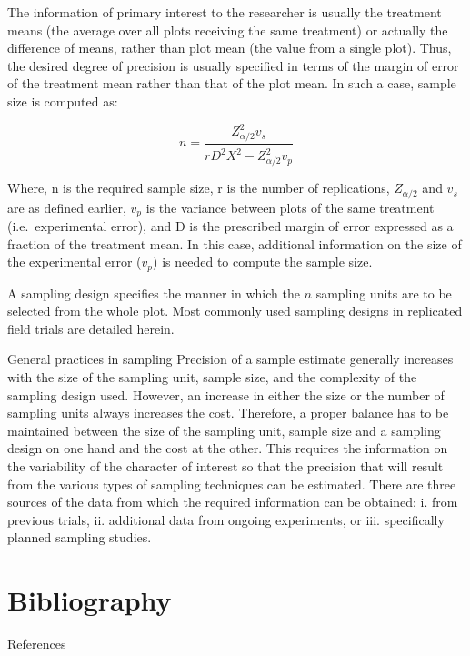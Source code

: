 \documentclass[
  ignorenonframetext,
  aspectratio=169]{beamer}
\begin{document}
\begin{frame}{}
\protect\hypertarget{section-12}{}
\footnotesize

The information of primary interest to the researcher is usually the
treatment means (the average over all plots receiving the same
treatment) or actually the difference of means, rather than plot mean
(the value from a single plot). Thus, the desired degree of precision is
usually specified in terms of the margin of error of the treatment mean
rather than that of the plot mean. In such a case, sample size is
computed as:

\[
n = \frac{Z_{\alpha/2}^2 v_s}{r D^2 \bar{X^2} - Z_{\alpha/2}^2 v_p}
\]

Where, n is the required sample size, r is the number of replications,
\(Z_{\alpha/2}\) and \(v_s\) are as defined earlier, \(v_p\) is the
variance between plots of the same treatment (i.e.~experimental error),
and D is the prescribed margin of error expressed as a fraction of the
treatment mean. In this case, additional information on the size of the
experimental error (\(v_p\)) is needed to compute the sample size.

A sampling design specifies the manner in which the \(n\) sampling units
are to be selected from the whole plot. Most commonly used sampling
designs in replicated field trials are detailed herein.
\end{frame}

\begin{frame}{General practices in sampling}
\protect\hypertarget{general-practices-in-sampling}{}
Precision of a sample estimate generally increases with the size of the
sampling unit, sample size, and the complexity of the sampling design
used. However, an increase in either the size or the number of sampling
units always increases the cost. Therefore, a proper balance has to be
maintained between the size of the sampling unit, sample size and a
sampling design on one hand and the cost at the other. This requires the
information on the variability of the character of interest so that the
precision that will result from the various types of sampling techniques
can be estimated. There are three sources of the data from which the
required information can be obtained: i. from previous trials, ii.
additional data from ongoing experiments, or iii. specifically planned
sampling studies.
\end{frame}

\hypertarget{bibliography}{%
\section{Bibliography}\label{bibliography}}

\begin{frame}{References}
\protect\hypertarget{references}{}
\end{frame}
\end{document}
